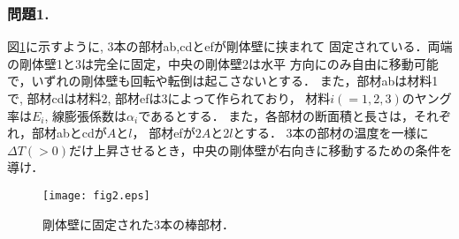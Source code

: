 \documentclass[10pt,a4j]{jarticle}
\begin{document}
\subsubsection*{問題1.}
図\ref{fig:fig2}に示すように, 3本の部材ab,cdとefが剛体壁に挟まれて
固定されている．両端の剛体壁1と3は完全に固定，中央の剛体壁2は水平
方向にのみ自由に移動可能で，いずれの剛体壁も回転や転倒は起こさないとする．
また，部材abは材料1で, 部材cdは材料2, 部材efは3によって作られており，
材料$i(=1,2,3)$のヤング率は$E_i$, 線膨張係数は$\alpha_i$であるとする．
また，各部材の断面積と長さは，それぞれ，部材abとcdが$A$と$l$，
部材efが$2A$と$2l$とする．
3本の部材の温度を一様に$\Delta T(>0)$だけ上昇させるとき，中央の剛体壁が右向きに移動するための条件を導け．
\begin{figure}[h]
	\begin{center}
	\texttt{[image: fig2.eps]} 
	\end{center}
	\caption{剛体壁に固定された3本の棒部材．} 
	\label{fig:fig2}
\end{figure}
\end{document}
